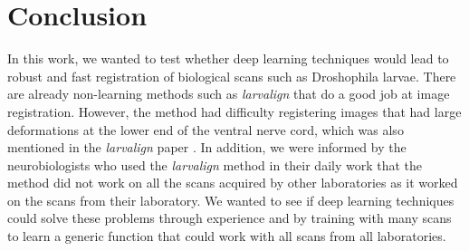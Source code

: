 \documentclass{book}
\begin{document}
	\chapter{Conclusion}
	In this work, we wanted to test whether deep learning techniques would lead to robust and fast registration of biological scans such as Droshophila larvae. There are already non-learning methods such as \textit{larvalign} \cite{larvalign} that do a good job at image registration. However, the method had difficulty registering images that had large deformations at the lower end of the ventral nerve cord, which was also mentioned in the \textit{larvalign} paper \cite{larvalign}. In addition, we were informed by the neurobiologists who used the \textit{larvalign} method in their daily work that the method did not work on all the scans acquired by other laboratories as it worked on the scans from their laboratory. We wanted to see if deep learning techniques could solve these problems through experience and by training with many scans to learn a generic function that could work with all scans from all laboratories.
\end{document}
